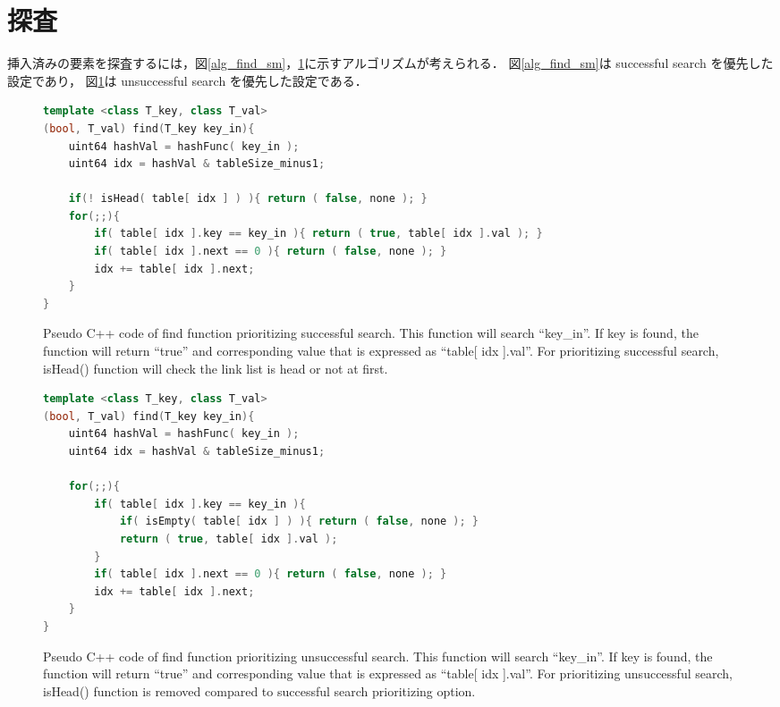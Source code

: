\section{探査}
挿入済みの要素を探査するには，図\ref{alg_find_sm}，\ref{alg_find_usm}に示すアルゴリズムが考えられる．
図\ref{alg_find_sm}は successful search を優先した設定であり，
図\ref{alg_find_usm}は unsuccessful search を優先した設定である．

\begin{figure}[h] %
\begin{lstlisting}[language=C++]
template <class T_key, class T_val>
(bool, T_val) find(T_key key_in){
	uint64 hashVal = hashFunc( key_in );
	uint64 idx = hashVal & tableSize_minus1;
	
	if(! isHead( table[ idx ] ) ){ return ( false, none ); }
	for(;;){
		if( table[ idx ].key == key_in ){ return ( true, table[ idx ].val ); }
		if( table[ idx ].next == 0 ){ return ( false, none ); }
		idx += table[ idx ].next;
	}
}
\end{lstlisting}
\caption{
  Pseudo C++ code of find function prioritizing successful search.
  This function will search ``key\_in''.
  If key is found, the function will return ``true'' and corresponding value that is expressed as ``table[ idx ].val''.
  For prioritizing successful search, isHead() function will check the link list is head or not at first.
}
\label{alg_find_sm}
\begin{lstlisting}[language=C++]
template <class T_key, class T_val>
(bool, T_val) find(T_key key_in){
	uint64 hashVal = hashFunc( key_in );
	uint64 idx = hashVal & tableSize_minus1;
	
	for(;;){
		if( table[ idx ].key == key_in ){
			if( isEmpty( table[ idx ] ) ){ return ( false, none ); }
			return ( true, table[ idx ].val );
		}
		if( table[ idx ].next == 0 ){ return ( false, none ); }
		idx += table[ idx ].next;
	}
}
\end{lstlisting}
\caption{
  Pseudo C++ code of find function prioritizing unsuccessful search.
  This function will search ``key\_in''.
  If key is found, the function will return ``true'' and corresponding value that is expressed as ``table[ idx ].val''.
  For prioritizing unsuccessful search, isHead() function is removed compared to successful search prioritizing option.
}
\label{alg_find_usm}
\end{figure}

